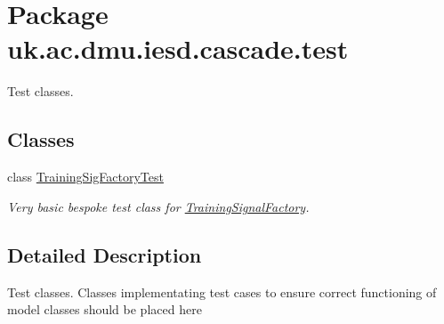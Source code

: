 \hypertarget{namespaceuk_1_1ac_1_1dmu_1_1iesd_1_1cascade_1_1test}{\section{Package uk.\-ac.\-dmu.\-iesd.\-cascade.\-test}
\label{namespaceuk_1_1ac_1_1dmu_1_1iesd_1_1cascade_1_1test}
}


Test classes.  


\subsection*{Classes}
\begin{DoxyCompactItemize}
\item 
class \hyperlink{classuk_1_1ac_1_1dmu_1_1iesd_1_1cascade_1_1test_1_1_training_sig_factory_test}{Training\-Sig\-Factory\-Test}
\begin{DoxyCompactList}\small\item\em Very basic bespoke test class for \hyperlink{}{Training\-Signal\-Factory}. \end{DoxyCompactList}\end{DoxyCompactItemize}


\subsection{Detailed Description}
Test classes. Classes implementating test cases to ensure correct functioning of model classes should be placed here 